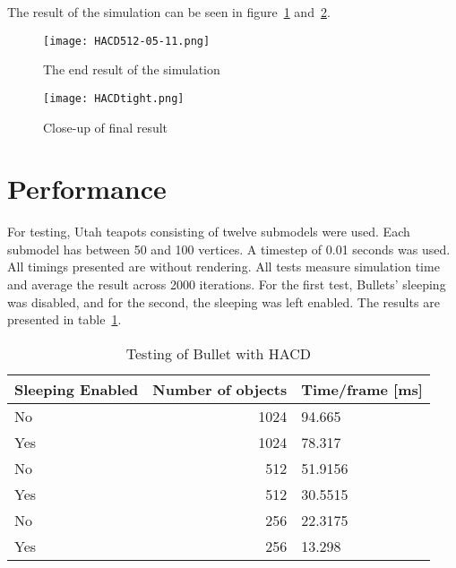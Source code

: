 The result of the simulation can be seen in figure~\ref{fig:hacd0.0} and~\ref{fig:tight}.
\begin{figure}[H]
  \centering
  \texttt{[image: HACD512-05-11.png]}
  \caption{The end result of the simulation}
  \label{fig:hacd0.0}
\end{figure}

\begin{figure}[H]
  \centering
  \texttt{[image: HACDtight.png]}
  \caption{Close-up of final result}
  \label{fig:tight}
\end{figure}

\section{Performance}
For testing, Utah teapots consisting of twelve submodels were used. Each submodel has
between 50 and 100 vertices. A timestep of 0.01 seconds was used. All timings
presented are without rendering. All tests measure simulation
time and average the result across 2000 iterations. For the first test, Bullets' sleeping was
disabled, and for the second, the sleeping was left enabled. The results are presented
in table~\ref{tab:hacdtest}.

\begin{table}[htbp]
\caption{Testing of Bullet with HACD}
\begin{center}
\begin{tabular}{|l|r|l|}
\hline
\textbf{Sleeping Enabled} & \multicolumn{1}{l|}{\textbf{Number of objects}} & \textbf{Time/frame [ms]} \\ \hline
No & 1024 & 94.665 \\ \hline
Yes  & 1024 & 78.317 \\ \hline
No & 512 & 51.9156 \\ \hline
Yes  & 512 & 30.5515 \\ \hline
No & 256 & 22.3175 \\ \hline
Yes  & 256 & 13.298 \\ \hline
\end{tabular}
\end{center}
\label{tab:hacdtest}
\end{table}



